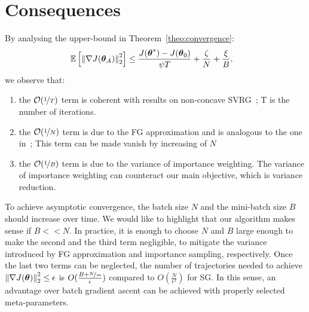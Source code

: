 \section{Consequences}\label{sec:consequence}

By analysing the upper-bound in Theorem~\ref{theo:convergence}:
	\begin{align*}
&\EVV[]
{\norm[2]{\nabla J(\vtheta_A)}^2} 
\leq
\frac{J(\vtheta^*)-J(\vtheta_0)}{\psi T} +
\frac{\zeta}{N}
+\frac{\xi}{B},
\end{align*}
 we observe that:
 \begin{enumerate}
 	\item  the $\mathcal{O}(\nicefrac{1}{T})$ term is coherent with results on non-concave SVRG~\citep[\eg][]{reddi2016stochastic}; T is the number of iterations.
 	\item the $\mathcal{O}(\nicefrac{1}{N})$ term is due to the \acs{FG} approximation and is analogous to the one in~\citep{harikandeh2015stopwasting}; This term can be made vanish by increasing of $N$
 	\item the $\mathcal{O}(\nicefrac{1}{B})$ term is due to the variance of importance weighting. The variance of importance weighting can counteract our main objective, which is variance reduction.
 \end{enumerate}
To achieve asymptotic convergence, the batch size $N$ and the mini-batch size $B$ should increase over time.
 We would like to highlight that our algorithm makes sense if  $B << N$.\newline
In practice, it is enough to choose $N$ and $B$ large enough to make the second and the third term negligible, \ie to mitigate the variance introduced by \acs{FG} approximation and importance sampling, respectively.
Once the last two terms can be neglected, the number of trajectories needed to achieve $\norm[2]{\gradJ{\vtheta}}^2\leq\epsilon$ is $O(\frac{B+\nicefrac{N}{m}}{\epsilon})$ compared to $O(\frac{N}{\epsilon^2})$ for \acs{SG}. In this sense, an advantage over batch gradient ascent can be achieved with properly selected meta-parameters. 